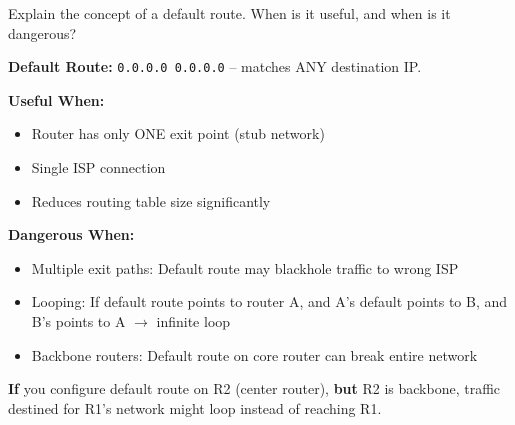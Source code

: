 \documentclass[12pt,a4paper]{article}
\begin{document}

\begin{qbox}{Explain the concept of a default route. When is it useful, and when is it dangerous?}
\end{qbox}

\begin{abox}
\textbf{Default Route:} \texttt{0.0.0.0 0.0.0.0} -- matches ANY destination IP.

\begin{center}
\end{center}

\textbf{Useful When:}
\begin{itemize}
    \item Router has only ONE exit point (stub network)
    \item Single ISP connection
    \item Reduces routing table size significantly
\end{itemize}

\textbf{Dangerous When:}
\begin{itemize}
    \item Multiple exit paths: Default route may blackhole traffic to wrong ISP
    \item Looping: If default route points to router A, and A's default points to B, and B's points to A $\rightarrow$ infinite loop
    \item Backbone routers: Default route on core router can break entire network
\end{itemize}

\textbf{If} you configure default route on R2 (center router), \textbf{but} R2 is backbone, traffic destined for R1's network might loop instead of reaching R1.
\end{abox}
\end{document}
